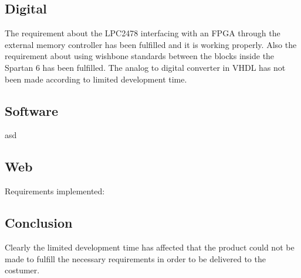 \subsection{Digital}
The requirement about the LPC2478 interfacing with an FPGA through the external memory controller has been fulfilled and it is working properly. Also the requirement about using wishbone standards between the blocks inside the Spartan 6 has been fulfilled. The analog to digital converter in VHDL has not been made according to limited development time.
\subsection{Software}
asd
\subsection{Web}
Requirements implemented: 
\subsection{Conclusion}
Clearly the limited development time has affected that the product could not be made to fulfill the necessary requirements in order to be delivered to the costumer.